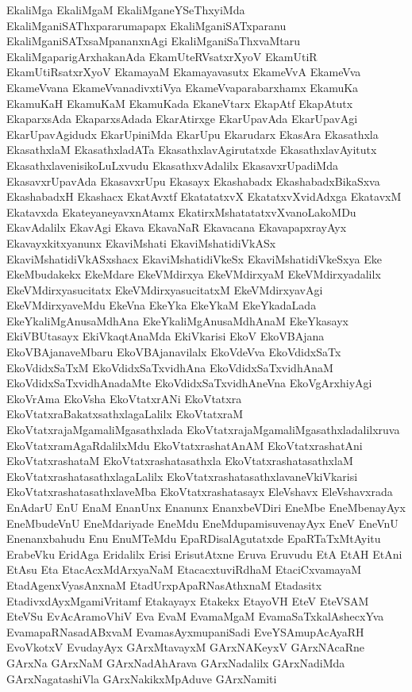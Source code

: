 {EkaliMga
EkaliMgaM
EkaliMganeYSeThxyiMda
EkaliMganiSAThxpararumapapx
EkaliMganiSATxparanu
EkaliMganiSATxsaMpananxnAgi
EkaliMganiSaThxvaMtaru
EkaliMgaparigArxhakanAda
EkamUteRVsatxrXyoV
EkamUtiR
EkamUtiRsatxrXyoV
EkamayaM
Ekamayavasutx
EkameVvA
EkameVva
EkameVvana
EkameVvanadivxtiVya
EkameVvaparabarxhamx
EkamuKa
EkamuKaH
EkamuKaM
EkamuKada
EkaneVtarx
EkapAtf
EkapAtutx
EkaparxsAda
EkaparxsAdada
EkarAtirxge
EkarUpavAda
EkarUpavAgi
EkarUpavAgidudx
EkarUpiniMda
EkarUpu
Ekarudarx
EkasAra
Ekasathxla
EkasathxlaM
EkasathxladATa
EkasathxlavAgirutatxde
EkasathxlavAyitutx
EkasathxlavenisikoLuLxvudu
EkasathxvAdalilx
EkasavxrUpadiMda
EkasavxrUpavAda
EkasavxrUpu
Ekasayx
Ekashabadx
EkashabadxBikaSxva
EkashabadxH
Ekashacx
EkatAvxtf
EkatatatxvX
EkatatxvXvidAdxga
EkatavxM
Ekatavxda
EkateyaneyavxnAtamx
EkatirxMshatatatxvXvanoLakoMDu
EkavAdalilx
EkavAgi
Ekava
EkavaNaR
Ekavacana
EkavapapxrayAyx
Ekavayxkitxyanunx
EkaviMshati
EkaviMshatidiVkASx
EkaviMshatidiVkASxshacx
EkaviMshatidiVkeSx
EkaviMshatidiVkeSxya
Eke
EkeMbudakekx
EkeMdare
EkeVMdirxya
EkeVMdirxyaM
EkeVMdirxyadalilx
EkeVMdirxyasucitatx
EkeVMdirxyasucitatxM
EkeVMdirxyavAgi
EkeVMdirxyaveMdu
EkeVna
EkeYka
EkeYkaM
EkeYkadaLada
EkeYkaliMgAnusaMdhAna
EkeYkaliMgAnusaMdhAnaM
EkeYkasayx
EkiVBUtasayx
EkiVkaqtAnaMda
EkiVkarisi
EkoV
EkoVBAjana
EkoVBAjanaveMbaru
EkoVBAjanavilalx
EkoVdeVva
EkoVdidxSaTx
EkoVdidxSaTxM
EkoVdidxSaTxvidhAna
EkoVdidxSaTxvidhAnaM
EkoVdidxSaTxvidhAnadaMte
EkoVdidxSaTxvidhAneVna
EkoVgArxhiyAgi
EkoVrAma
EkoVsha
EkoVtatxrANi
EkoVtatxra
EkoVtatxraBakatxsathxlagaLalilx
EkoVtatxraM
EkoVtatxrajaMgamaliMgasathxlada
EkoVtatxrajaMgamaliMgasathxladalilxruva
EkoVtatxramAgaRdalilxMdu
EkoVtatxrashatAnAM
EkoVtatxrashatAni
EkoVtatxrashataM
EkoVtatxrashatasathxla
EkoVtatxrashatasathxlaM
EkoVtatxrashatasathxlagaLalilx
EkoVtatxrashatasathxlavaneVkiVkarisi
EkoVtatxrashatasathxlaveMba
EkoVtatxrashatasayx
EleVshavx
EleVshavxrada
EnAdarU
EnU
EnaM
EnanUnx
Enanunx
EnanxbeVDiri
EneMbe
EneMbenayAyx
EneMbudeVnU
EneMdariyade
EneMdu
EneMdupamisuvenayAyx
EneV
EneVnU
Enenanxbahudu
Enu
EnuMTeMdu
EpaRDisalAgutatxde
EpaRTaTxMtAyitu
ErabeVku
EridAga
Eridalilx
Erisi
ErisutAtxne
Eruva
Eruvudu
EtA
EtAH
EtAni
EtAsu
Eta
EtacAcxMdArxyaNaM
EtacacxtuviRdhaM
EtaciCxvamayaM
EtadAgenxVyasAnxnaM
EtadUrxpApaRNasAthxnaM
Etadasitx
EtadivxdAyxMgamiVritamf
Etakayayx
Etakekx
EtayoVH
EteV
EteVSAM
EteVSu
EvAcAramoVhiV
Eva
EvaM
EvamaMgaM
EvamaSaTxkalAshecxYva
EvamapaRNasadABxvaM
EvamasAyxmupaniSadi
EveYSAmupAcAyaRH
EvoVkotxV
EvudayAyx
GArxMtavayxM
GArxNAKeyxV
GArxNAcaRne
GArxNa
GArxNaM
GArxNadAhArava
GArxNadalilx
GArxNadiMda
GArxNagatashiVla
GArxNakikxMpAduve
GArxNamiti
}
